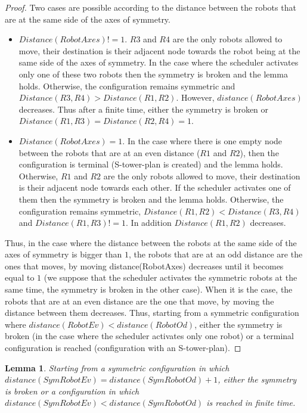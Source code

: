 \documentclass[12pt]{llncs}
\newtheorem{lem}{Lemma}
\begin{document}
\begin{proof}
Two cases are possible according to the distance between the robots that are at the same side of the axes of symmetry. 
\begin{itemize}
\item{$Distance(RobotAxes)!=1$. $R3$ and $R4$ are the only robots allowed to move, their destination is their adjacent node towards the robot being at the same side of the axes of symmetry. In the case where the scheduler activates only one of these two robots then the symmetry is broken and the lemma holds. Otherwise, the configuration remains symmetric and $Distance(R3,R4)>Distance(R1,R2)$. However, $distance(RobotAxes)$ decreases. Thus after a finite time, either the symmetry is broken or $Distance(R1,R3)=Distance(R2,R4)=1$.}
\item{$Distance(RobotAxes)=1$. In the case where there is one empty node between the robots that are at an even distance ($R1$ and $R2$), then the configuration is terminal (S-tower-plan is created) and the lemma holds. Otherwise, $R1$ and $R2$ are the only robots allowed to move, their destination is their adjacent node towards each other. If the scheduler activates one of them then the symmetry is broken and the lemma holds. Otherwise, the configuration remains symmetric, $Distance(R1,R2)<Distance(R3,R4)$ and $Distance(R1,R3)!=1$. In addition $Distance(R1,R2)$ decreases.}
\end{itemize}
Thus, in the case where the distance between the robots at the same side of the axes of symmetry is bigger than $1$, the robots that are at an odd distance are the ones that moves, by moving distance(RobotAxes) decreases until it becomes equal to $1$ (we suppose that the scheduler activates the symmetric robots at the same time, the symmetry is broken in the other case). When it is the case, the robots that are at an even distance are the one that move, by moving the distance between them decreases. Thus, starting from a symmetric configuration where $distance(RobotEv)<distance(RobotOd)$, either the symmetry is broken (in the case where the scheduler activates only one robot) or a terminal configuration is reached (configuration with an S-tower-plan). 
\end{proof}
\begin{lem}
\label{lem:EvOd1}
Starting from a symmetric configuration in which $distance(SymRobotEv)=distance(SymRobotOd)+1$, either the symmetry is broken or a configuration in which $distance(SymRobotEv)<distance(SymRobotOd)$ is reached in finite time. 
\end{lem}
\end{document}
